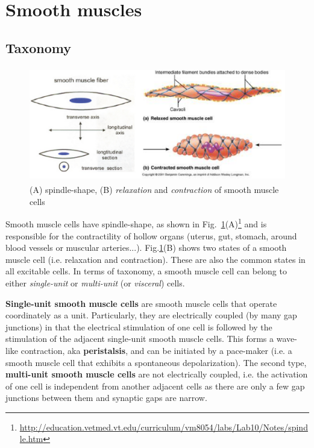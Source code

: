 \section{Smooth muscles}
\label{sec:smooth-muscles}

\subsection{Taxonomy}
\label{sec:taxonomy}


\begin{figure}[htb]
  \centerline{\includegraphics[height=5cm]{./images/smooth_muscle_cells.eps}}
  \caption{(A) spindle-shape, (B) {\it relaxation} and
    {\it contraction} of smooth muscle
    cells}\label{fig:smooth_muscle_cells}
\end{figure}

Smooth muscle cells have
spindle-shape, as shown in Fig.~\ref{fig:smooth_muscle_cells}(A)\footnote{\url{http://education.vetmed.vt.edu/curriculum/vm8054/labs/Lab10/Notes/spindle.htm}}
and is responsible for the contractility of hollow organs (uterus,
gut, stomach, around blood vessels or muscular arteries...).
Fig.\ref{fig:smooth_muscle_cells}(B) shows two states of a smooth muscle
cell (i.e. relaxation and contraction). These are also the common
states in all excitable cells. In terms of taxonomy, a smooth muscle
cell can belong to either {\it single-unit} or {\it multi-unit} (or
{\it visceral}) cells.

{\bf Single-unit smooth muscle cells} are smooth muscle cells that
operate coordinately as a unit. Particularly, they are electrically
coupled (by many gap junctions) in that the electrical stimulation of
one cell is followed by the stimulation of the adjacent single-unit
smooth muscle cells. This forms a wave-like contraction, aka
{\bf peristalsis}, and can be initiated by a pace-maker (i.e. a smooth
muscle cell that exhibits a spontaneous depolarization).  The second
type, {\bf multi-unit smooth muscle cells} are not electrically
coupled, i.e. the activation of one cell is independent from another
adjacent cells as there are only a few gap junctions between them and
synaptic gaps are narrow.


